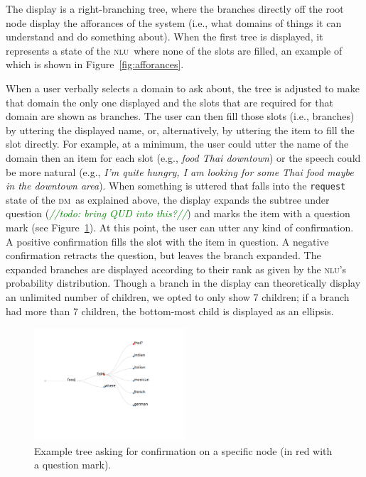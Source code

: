 \documentclass[11pt]{article}
\newcommand{\todo}[1]{\textcolor{green}{\emph{//todo: #1//}}}
\newcommand{\nlu}[0]{\textsc{nlu}}
\newcommand{\dm}[0]{\textsc{dm}}
\begin{document}
The display is a right-branching tree, where the branches directly off the root node display the afforances of the system (i.e., what domains of things it can understand and do something about). When the first tree is displayed, it represents a state of the \nlu\ where none of the slots are filled, an example of which is shown in Figure~\ref{fig:afforances}. 

When a user verbally selects a domain to ask about, the tree is adjusted to make that domain the only one displayed and the slots that are required for that domain are shown as branches. The user can then fill those slots (i.e., branches) by uttering the displayed name, or, alternatively, by uttering the item to fill the slot directly. For example, at a minimum, the user could utter the name of the domain then an item for each slot (e.g.,  \emph{food Thai downtown}) or the speech could be more natural (e.g., \emph{I'm quite hungry, I am looking for some Thai food maybe in the downtown area}). When something is uttered that falls into the \texttt{request} state of the \dm\ as explained above, the display expands the subtree under question (\todo{bring QUD into this?}) and marks the item with a question mark (see Figure~\ref{fig:confirm}). At this point, the user can utter any kind of confirmation. A positive confirmation fills the slot with the item in question. A negative confirmation retracts the question, but leaves the branch expanded. The expanded branches are displayed according to their rank as given by the \nlu's probability distribution. Though a branch in the display can theoretically display an unlimited number of children, we opted to only show 7 children; if a branch had more than 7 children, the bottom-most child is displayed as an ellipsis. 

\begin{figure}[ht]
  \centering
      \includegraphics[width=0.5\textwidth]{figures/diatree-confirmation.pdf}	
      \caption{Example tree asking for confirmation on a specific node (in red with a question mark).\label{fig:confirm}}
\end{figure}
\end{document}
